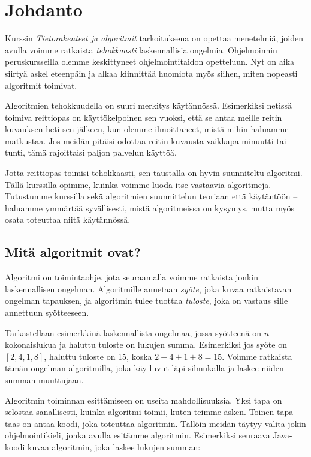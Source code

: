 \chapter{Johdanto}

Kurssin \emph{Tietorakenteet ja algoritmit} tarkoituksena
on opettaa menetelmiä, joiden avulla voimme ratkaista
\emph{tehokkaasti} laskennallisia ongelmia.
Ohjelmoinnin peruskursseilla olemme keskittyneet
ohjelmointitaidon opetteluun.
Nyt on aika siirtyä askel eteenpäin ja alkaa kiinnittää
huomiota myös siihen, miten nopeasti algoritmit toimivat.

Algoritmien tehokkuudella on suuri merkitys käytännössä.
Esimerkiksi netissä toimiva reittiopas on käyttökelpoinen sen vuoksi,
että se antaa meille reitin kuvauksen heti sen jälkeen, kun olemme
ilmoittaneet, mistä mihin haluamme matkustaa.
Jos meidän pitäisi odottaa reitin kuvausta vaikkapa minuutti tai tunti,
tämä rajoittaisi paljon palvelun käyttöä.

Jotta reittiopas toimisi tehokkaasti, sen taustalla on
hyvin suunniteltu algoritmi.
Tällä kurssilla opimme, kuinka voimme luoda itse vastaavia algoritmeja.
Tutustumme kurssilla sekä algoritmien suunnittelun teoriaan että
käytäntöön -- haluamme ymmärtää syvällisesti, mistä algoritmeissa on kysymys,
mutta myös osata toteuttaa niitä käytännössä.

\section{Mitä algoritmit ovat?}

Algoritmi on toimintaohje, jota seuraamalla voimme ratkaista
jonkin laskennallisen ongelman.
Algoritmille annetaan \emph{syöte},
joka kuvaa ratkaistavan ongelman tapauksen,
ja algoritmin tulee tuottaa \emph{tuloste},
joka on vastaus sille annettuun syötteeseen.

Tarkastellaan esimerkkinä laskennallista ongelmaa,
jossa syötteenä on $n$ kokonaislukua ja haluttu
tuloste on lukujen summa.
Esimerkiksi jos syöte on $[2,4,1,8]$,
haluttu tuloste on 15, koska $2+4+1+8=15$.
Voimme ratkaista tämän ongelman algoritmilla,
joka käy luvut läpi silmukalla ja laskee niiden
summan muuttujaan.

Algoritmin toiminnan esittämiseen on useita mahdollisuuksia.
Yksi tapa on selostaa sanallisesti, kuinka algoritmi toimii,
kuten teimme äsken.
Toinen tapa taas on antaa koodi, joka toteuttaa algoritmin.
Tällöin meidän täytyy valita jokin ohjelmointikieli,
jonka avulla esitämme algoritmin.
Esimerkiksi seuraava Java-koodi kuvaa algoritmin,
joka laskee lukujen summan:

